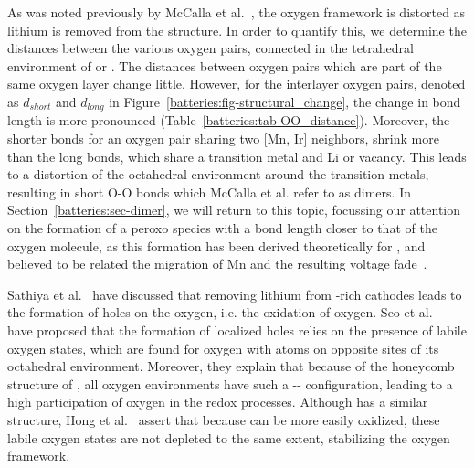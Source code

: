 \begin{refsection}
As was noted previously by McCalla et al.~\cite{McCalla2015}, the oxygen 
framework is distorted as lithium is removed from the structure. In order to 
quantify this, we determine the distances between the various oxygen pairs, 
connected in the tetrahedral environment of  or . The distances 
between oxygen pairs which are part of the same oxygen layer change little. 
However, for the interlayer oxygen pairs, denoted as $d_{short}$ and 
$d_{long}$ in Figure~\ref{batteries:fig-structural_change}, the change in bond 
length is more pronounced (Table~\ref{batteries:tab-OO_distance}). Moreover, 
the shorter bonds for an oxygen pair sharing two [Mn, Ir] neighbors, shrink 
more than the long bonds, which share a transition metal and Li or vacancy. 
This leads to a distortion of the octahedral environment around the transition 
metals, resulting in short O-O bonds which McCalla et al. refer to as dimers. 
In Section~\ref{batteries:sec-dimer}, we will return to this topic, focussing 
our attention on the formation of a peroxo species with a bond length closer 
to that of the oxygen molecule, as this formation has been derived 
theoretically for , and believed to be related the migration of Mn 
and the resulting voltage fade~\cite{Chen2016}. 
 
 
 
Sathiya et al.~\cite{Sathiya2013} have discussed that removing lithium from 
-rich cathodes leads to the formation of holes on the oxygen, i.e. the 
oxidation of oxygen. Seo et al.~\cite{Seo2016} have proposed that the 
formation of localized holes relies on the presence of labile oxygen states, 
which are found for oxygen with  atoms on opposite sites of its 
octahedral environment. Moreover, they explain that because of the honeycomb 
structure of , all oxygen environments have such a 
-- configuration, leading to a high participation of 
oxygen in the redox processes. Although  has a similar structure, 
Hong et al.~\cite{Hong2019} assert that because  can be more 
easily oxidized, these labile oxygen states are not depleted to the same 
extent, stabilizing the oxygen framework. 
 

\end{refsection}
